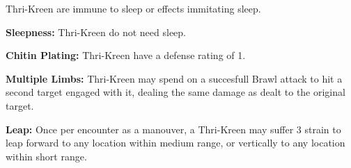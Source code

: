 {Thri-Kreen are immune to sleep or effects immitating sleep.}
{\item \textbf{Sleepness:} Thri-Kreen do not need sleep. }
{\item \textbf{Chitin Plating:} Thri-Kreen have a defense rating of 1.}
{\item \textbf{Multiple Limbs:} Thri-Kreen may spend \advantage\advantage on a succesfull Brawl attack to hit a second target engaged with it, dealing the same damage as dealt to the original target.}
{\item \textbf{Leap:} Once per encounter as a manouver, a Thri-Kreen may suffer 3 strain to leap forward to any location within medium range, or vertically to any location within short range.}
{}
{}
{}
{}
{}
